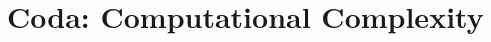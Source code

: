 \documentclass[12pt, titlepage]{article}
\begin{document}
















\part{Coda: Computational Complexity}



\end{document}
